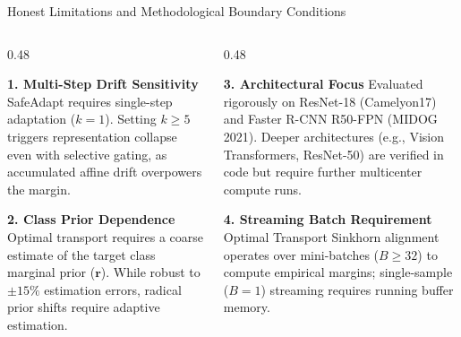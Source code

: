 \documentclass[aspectratio=169,10pt]{beamer}
\begin{document}
\begin{frame}{Honest Limitations and Methodological Boundary Conditions}
    \begin{columns}[T]
        \begin{column}{0.48\textwidth}
            \begin{alertblock}{\textbf{1. Multi-Step Drift Sensitivity}}
                \small
                SafeAdapt requires single-step adaptation ($k=1$). Setting $k \ge 5$ triggers representation collapse even with selective gating, as accumulated affine drift overpowers the margin.
            \end{alertblock}
            \vspace{0.2cm}
            \begin{alertblock}{\textbf{2. Class Prior Dependence}}
                \small
                Optimal transport requires a coarse estimate of the target class marginal prior ($\mathbf{r}$). While robust to $\pm 15\%$ estimation errors, radical prior shifts require adaptive estimation.
            \end{alertblock}
        \end{column}
        \begin{column}{0.48\textwidth}
            \begin{alertblock}{\textbf{3. Architectural Focus}}
                \small
                Evaluated rigorously on ResNet-18 (Camelyon17) and Faster R-CNN R50-FPN (MIDOG 2021). Deeper architectures (e.g., Vision Transformers, ResNet-50) are verified in code but require further multicenter compute runs.
            \end{alertblock}
            \vspace{0.2cm}
            \begin{alertblock}{\textbf{4. Streaming Batch Requirement}}
                \small
                Optimal Transport Sinkhorn alignment operates over mini-batches ($B \ge 32$) to compute empirical margins; single-sample ($B=1$) streaming requires running buffer memory.
            \end{alertblock}
        \end{column}
    \end{columns}
\end{frame}
\end{document}
